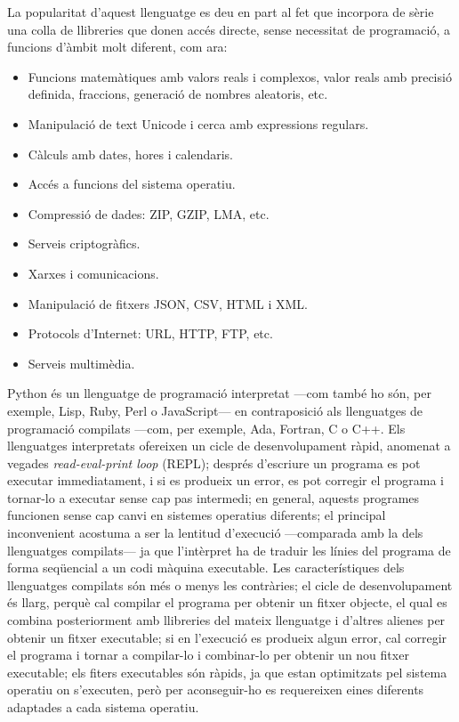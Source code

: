 La popularitat d'aquest llenguatge es deu en part al fet que incorpora de sèrie una colla de llibreries que donen accés directe, sense necessitat de programació, a funcions d'àmbit molt diferent, com ara:
\begin{itemize}
	\item  Funcions matemàtiques amb valors reals i complexos, valor reals amb precisió definida, fraccions, generació de nombres aleatoris, etc.
	\item Manipulació de text Unicode i cerca amb expressions regulars.
	\item Càlculs amb dates, hores i calendaris.
	\item Accés a funcions del sistema operatiu.
	\item Compressió de dades: ZIP, GZIP, LMA, etc.
	\item Serveis criptogràfics.
	\item Xarxes i comunicacions.
	\item Manipulació de fitxers JSON, CSV, HTML i XML.
	\item Protocols d'Internet: URL, HTTP, FTP, etc.
	\item Serveis multimèdia.
\end{itemize}


Python és un llenguatge de programació interpretat ---com també ho són, per exemple,  Lisp, Ruby, Perl o JavaScript--- en contraposició als llenguatges de programació compilats ---com, per exemple, Ada, Fortran, C o C++. Els llenguatges interpretats ofereixen un cicle de desenvolupament ràpid, anomenat a vegades  \textit{read-eval-print loop} (REPL); després d'escriure un programa es pot executar immediatament, i si es produeix  un error, es pot corregir el programa i tornar-lo a executar sense cap pas intermedi; en general, aquests programes funcionen sense cap canvi en  sistemes operatius diferents; el principal inconvenient acostuma a ser la lentitud d'execució ---comparada amb la dels llenguatges compilats--- ja que l'intèrpret ha de traduir les línies del programa de forma seqüencial a un codi màquina executable. Les característiques dels llenguatges compilats són més o menys les contràries; el cicle de desenvolupament és llarg, perquè cal compilar el programa per obtenir un fitxer objecte, el qual es combina posteriorment amb llibreries del mateix llenguatge i d'altres alienes per obtenir un fitxer executable; si en l'execució es produeix algun error, cal corregir el programa i tornar a compilar-lo i combinar-lo per obtenir un nou fitxer executable; els fiters executables són ràpids, ja que estan optimitzats pel sistema operatiu on s'executen, però per aconseguir-ho  es requereixen eines diferents adaptades a cada sistema operatiu.

